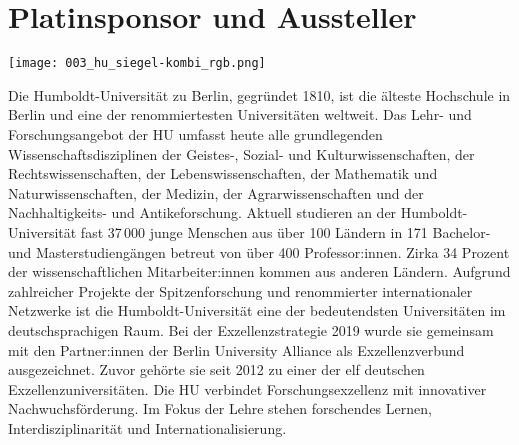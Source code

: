 \section*{Platinsponsor und Aussteller}

\vspace{-0.5cm}
\centerline{\texttt{[image: 003\_hu\_siegel-kombi\_rgb.png]}}
Die Humboldt-Universität zu Berlin, gegründet 1810, ist die älteste Hochschule in Berlin
und eine der renommiertesten Universitäten weltweit. Das Lehr- und Forschungsangebot der HU umfasst heute alle grundlegenden
Wissenschaftsdisziplinen der Geistes-, Sozial- und Kulturwissenschaften, der Rechtswissenschaften, der Lebenswissenschaften, der Mathematik und Naturwissenschaften, der Medizin, der Agrarwissenschaften und der Nachhaltigkeits- und Antikeforschung. Aktuell studieren an der Humboldt-Universität fast 37\,000 junge Menschen aus über 100 Ländern in 171 Bachelor- und Masterstudiengängen betreut von über 400 Professor:innen. Zirka 34 Prozent der wissenschaftlichen Mitarbeiter:innen kommen aus anderen Ländern. Aufgrund zahlreicher Projekte der Spitzenforschung und renommierter internationaler Netzwerke ist die Humboldt-Universität eine der bedeutendsten Universitäten im deutschsprachigen Raum. Bei der Exzellenzstrategie 2019 wurde sie gemeinsam mit den Partner:innen der Berlin University Alliance als Exzellenzverbund ausgezeichnet. Zuvor gehörte sie seit 2012 zu einer der elf deutschen Exzellenzuniversitäten. Die HU verbindet Forschungsexzellenz mit innovativer Nachwuchsförderung. Im Fokus der Lehre stehen forschendes Lernen, Interdisziplinarität und Internationalisierung.
